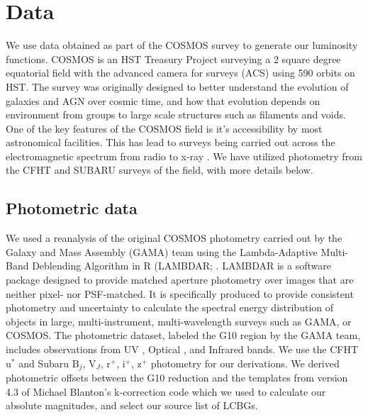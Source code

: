 \documentclass[manuscript]{aastex61}
\begin{document}
\section{Data}
\label{obs}
We use data obtained as part of the COSMOS survey to generate our luminosity functions. COSMOS is an HST Treasury Project \citep{2007ApJS..172....1S} surveying a 2 square degree equatorial field with the advanced camera for surveys (ACS) using 590 orbits on HST. The survey was originally designed to better understand the evolution of galaxies and AGN over cosmic time, and how that evolution depends on environment from groups to large scale structures such as filaments and voids. One of the key features of the COSMOS field is it's accessibility by most astronomical facilities. This has lead to surveys being carried out across the electromagnetic spectrum from radio \citep{} to x-ray \citep{}. We have utilized photometry from the CFHT and SUBARU surveys of the field, with more details below. 

\subsection{Photometric data}
We used a reanalysis of the original COSMOS photometry carried out by the Galaxy and Mass Assembly (GAMA) team \citep{2017MNRAS.464.1569A} using the Lambda-Adaptive Multi-Band Deblending Algorithm in R (LAMBDAR; \citet{2016MNRAS.460..765W}. LAMBDAR is a software package designed to provide matched aperture photometry over images that are neither pixel- nor PSF-matched. It is specifically produced to provide consistent photometry and uncertainty to calculate the spectral energy distribution of objects in large, multi-instrument, multi-wavelength surveys such as GAMA, or COSMOS. The photometric dataset, labeled the G10 region by the GAMA team, includes observations from UV \citep{2007ApJS..172..468Z}, Optical \citep{2007ApJS..172...99C,2007ApJS..172....9T,2015PASJ...67..104T}, and Infrared \citep{2012A&A...544A.156M,2007ApJS..172...86S,2012MNRAS.424.1614O} bands. We use the CFHT u$^{*}$ and Subaru B$_{j}$, V$_{J}$, r$^{+}$, i$^{+}$, z$^{+}$ photometry for our derivations. We derived photometric offsets between the G10 reduction and the templates from version 4.3 of Michael Blanton's k-correction code \citep{2007AJ....133..734B} which we used to calculate our absolute magnitudes, and select our source list of LCBGs. 
\end{document}
